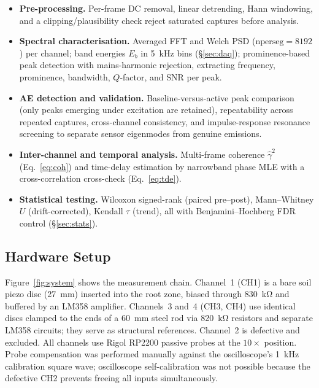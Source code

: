\documentclass[10pt,a4paper,twocolumn]{article}
\newcommand{\gammasq}{\ensuremath{\hat{\gamma}^2}}
\begin{document}
\begin{itemize}[leftmargin=1.2em,itemsep=1pt,topsep=2pt]
  \item \textbf{Pre-processing.} Per-frame DC removal, linear detrending, Hann windowing, and a clipping/plausibility check reject saturated captures before analysis.
  \item \textbf{Spectral characterisation.} Averaged FFT and Welch PSD ($\text{nperseg}=8192$) per channel; band energies $E_b$ in \SI{5}{\kilo\hertz} bins (\S\ref{sec:daq}); prominence-based peak detection with mains-harmonic rejection, extracting frequency, prominence, bandwidth, $Q$-factor, and SNR per peak.
  \item \textbf{AE detection and validation.} Baseline-versus-active peak comparison (only peaks emerging under excitation are retained), repeatability across repeated captures, cross-channel consistency, and impulse-response resonance screening to separate sensor eigenmodes from genuine emissions.
  \item \textbf{Inter-channel and temporal analysis.} Multi-frame coherence $\gammasq$ (Eq.~\ref{eq:coh}) and time-delay estimation by narrowband phase MLE with a cross-correlation cross-check (Eq.~\ref{eq:tde}).
  \item \textbf{Statistical testing.} Wilcoxon signed-rank (paired pre--post), Mann--Whitney $U$ (drift-corrected), Kendall $\tau$ (trend), all with Benjamini--Hochberg FDR control (\S\ref{sec:stats}).
\end{itemize}

\subsection{Hardware Setup}
\label{sec:hw}

Figure~\ref{fig:system} shows the measurement chain. Channel~1 (CH1) is a bare soil piezo disc (\SI{27}{\milli\metre}) inserted into the root zone, biased through \SI{830}{\kilo\ohm} and buffered by an LM358 amplifier. Channels~3 and~4 (CH3, CH4) use identical discs clamped to the ends of a \SI{60}{\milli\metre} steel rod via \SI{820}{\kilo\ohm} resistors and separate LM358 circuits; they serve as structural references. Channel~2 is defective and excluded. All channels use Rigol RP2200 passive probes at the $10\times$ position. Probe compensation was performed manually against the oscilloscope's \SI{1}{\kilo\hertz} calibration square wave; oscilloscope self-calibration was not possible because the defective CH2 prevents freeing all inputs simultaneously.
\end{document}
